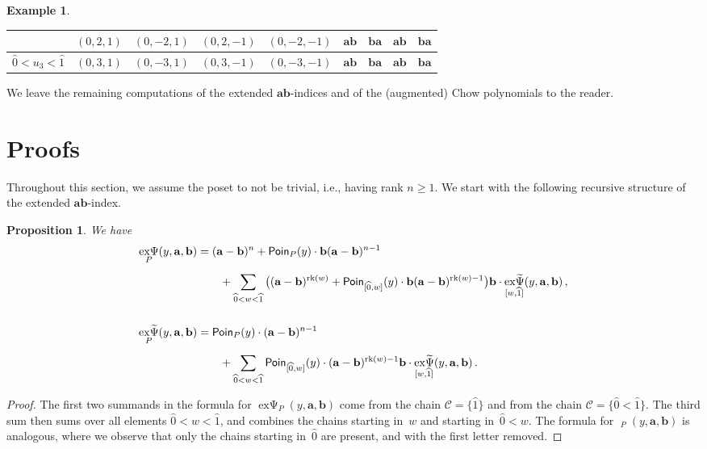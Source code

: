 \documentclass[a4paper, english,reqno, 11pt]{amsart}
\theoremstyle{plain}
\newtheorem{proposition}[theorem]{Proposition}
\theoremstyle{definition}
\newtheorem{example}[theorem]{Example}
\DeclareMathOperator{\rk}{rk}
\DeclareMathOperator{\expsi}{ex\Psi}
\DeclareMathOperator{\expsitilde}{ex\widetilde{\Psi}}
\newcommand{\zero}{\widehat{0}}
\newcommand{\one}{\widehat{1}}
\newcommand{\aaa}{\mathbf{a}}
\newcommand{\bbb}{\mathbf{b}}
\newcommand{\cC}{\mathcal{C}}
\newcommand{\Poin}{\mathcal{\sf Poin}}
\begin{document}
\begin{example}
\begin{center}
\begin{tabular}{c|cccc|cccc}
        & $(0,2,1)$ & $(0,-2,1)$  & $(0,2,-1)$ & $(0,-2,-1)$ 
        & $\aaa\bbb$ & $\bbb\aaa$  & $\aaa\bbb$ & $\bbb\aaa$ \\ \hline
    $\hat 0 < u_3 < \hat 1$ 
        & $(0,3,1)$ & $(0,-3,1)$  & $(0,3,-1)$ & $(0,-3,-1)$ 
        & $\aaa\bbb$ & $\bbb\aaa$  & $\aaa\bbb$ & $\bbb\aaa$ 
    \end{tabular}
    \end{center}
    We leave the remaining computations of the extended $\aaa\bbb$-indices and of the (augmented) Chow polynomials to the reader.
\end{example}

\section{Proofs}

Throughout this section, we assume the poset to not be trivial, i.e., having rank $n \geq 1$.
We start with the following recursive structure of the extended $\aaa\bbb$-index.
\begin{proposition}
\label{lemma:recursion expsi}
    We have
    \begin{align*}
    \expsi_P(y,\aaa,\bbb) &= (\aaa-\bbb)^{n} + \Poin_P(y)\cdot \bbb (\aaa-\bbb)^{n-1} \\[5pt]
             &\qquad + \sum_{\zero < w < \one} \big( (\aaa-\bbb)^{\rk(w)} + \Poin_{[\zero,w]}(y) \cdot \bbb (\aaa-\bbb)^{\rk(w) -1} \big) \bbb \cdot \expsitilde_{[w,\one]}(y,\aaa,\bbb) \,, \\[15pt]
    \expsitilde_P(y,\aaa,\bbb) &= \Poin_P(y)\cdot (\aaa-\bbb)^{n-1} \\[5pt]
                  &\qquad + \sum_{\zero < w < \one}\Poin_{[\zero,w]}(y)\cdot(\aaa-\bbb)^{\rk(w) -1}\bbb \cdot \expsitilde_{[w,\one]}(y,\aaa,\bbb) \,.
    \end{align*}
\end{proposition}
\begin{proof}
    The first two summands in the formula for $\expsi_P(y,\aaa,\bbb)$ come from the chain $\cC = \{\hat 1\}$ and from the chain $\cC = \{\hat 0 < \hat 1\}$.
    The third sum then sums over all elements $\hat 0 < w < \hat 1$, and combines the chains starting in~$w$ and starting in~$\hat 0 < w$.
    The formula for $\expsitilde_P(y,\aaa,\bbb)$ is analogous, where we observe that only the chains starting in~$\hat 0$ are present, and with the first letter removed.
\end{proof}
\end{document}
